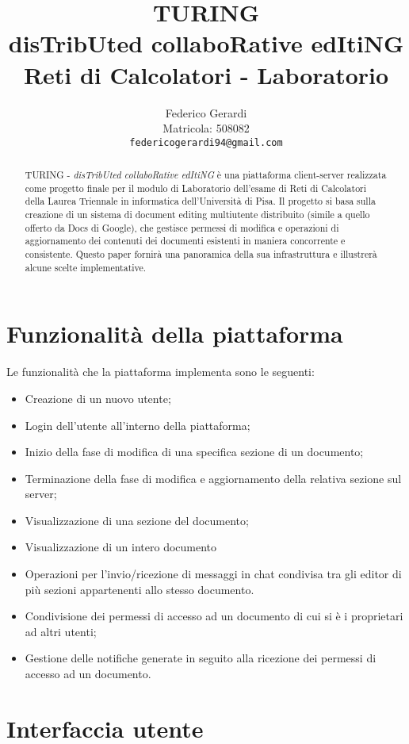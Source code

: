\documentclass{article}
\title{
	TURING \\
	\large disTribUted collaboRative edItiNG \\
	\large Reti di Calcolatori - Laboratorio}
\author{
	Federico Gerardi \\
	Matricola: 508082 \\
	\texttt{federicogerardi94@gmail.com}}
\begin{document}
\maketitle
\bigskip
\begin{abstract}
TURING - \textit{disTribUted collaboRative edItiNG} è una piattaforma client-server realizzata come progetto finale per il modulo di Laboratorio dell'esame di Reti di Calcolatori della Laurea Triennale in informatica dell'Università di Pisa. Il progetto si basa sulla creazione di un sistema di document editing multiutente distribuito (simile a quello offerto da Docs di Google), che gestisce permessi di modifica e operazioni di aggiornamento dei contenuti dei documenti esistenti in maniera concorrente e consistente. Questo paper fornirà una panoramica della sua infrastruttura e illustrerà alcune scelte implementative.
\end{abstract}

\newpage

\section{Funzionalità della piattaforma}
Le funzionalità che la piattaforma implementa sono le seguenti:
\begin{itemize}
	\item Creazione di un nuovo utente;
	\item Login dell'utente all'interno della piattaforma;
	\item Inizio della fase di modifica di una specifica sezione di un documento;
	\item Terminazione della fase di modifica e aggiornamento della relativa sezione sul server;
	\item Visualizzazione di una sezione del documento;
	\item Visualizzazione di un intero documento
	\item Operazioni per l'invio/ricezione di messaggi in chat condivisa tra gli editor di più sezioni appartenenti allo stesso documento.
	\item Condivisione dei permessi di accesso ad un documento di cui si è i proprietari ad altri utenti;
	\item Gestione delle notifiche generate in seguito alla ricezione dei permessi di accesso ad un documento.
\end{itemize}

\section{Interfaccia utente}
\end{document}
